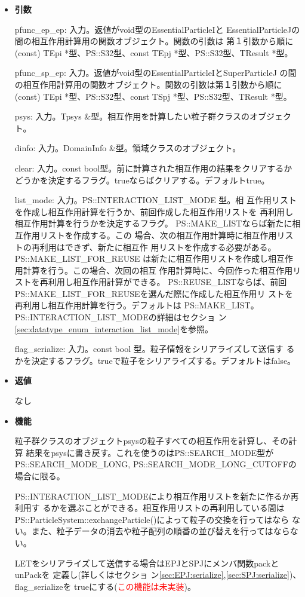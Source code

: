 \begin{itemize}

\item {\bf 引数}

pfunc\_ep\_ep: 入力。返値がvoid型のEssentialParticleIと
EssentialParticleJの間の相互作用計算用の関数オブジェクト。関数の引数は
第１引数から順に(const) TEpi *型、PS::S32型、const
TEpj *型、PS::S32型、TResult *型。

pfunc\_sp\_ep: 入力。返値がvoid型のEssentialParticleIとSuperParticleJ
の間の相互作用計算用の関数オブジェクト。関数の引数は第１引数から順に
(const) TEpi *型、PS::S32型、const TSpj *型、PS::S32型、TResult *型。

psys: 入力。Tpsys \&型。相互作用を計算したい粒子群クラスのオブジェクト。

dinfo: 入力。DomainInfo \&型。領域クラスのオブジェクト。

clear: 入力。const bool型。前に計算された相互作用の結果をクリアするか
どうかを決定するフラグ。trueならばクリアする。デフォルトtrue。

list\_mode: 入力。PS::INTERACTION\_LIST\_MODE 型。相
互作用リストを作成し相互作用計算を行うか、前回作成した相互作用リストを
再利用し相互作用計算を行うかを決定するフラグ。
PS::MAKE\_LISTならば新たに相互作用リストを作成する。この
場合、次の相互作用計算時に相互作用リストの再利用はできず、新たに相互作
用リストを作成する必要がある。PS::MAKE\_LIST\_FOR\_REUSE
は新たに相互作用リストを作成し相互作用計算を行う。この場合、次回の相互
作用計算時に、今回作った相互作用リストを再利用し相互作用計算ができる。
PS::REUSE\_LISTならば、前回
PS::MAKE\_LIST\_FOR\_REUSEを選んだ際に作成した相互作用リ
ストを再利用し相互作用計算を行う。デフォルトは
PS::MAKE\_LIST。PS::INTERACTION\_LIST\_MODEの詳細はセクショ
ン\ref{sec:datatype_enum_interaction_list_mode}を参照。

flag\_serialize: 入力。const bool 型。粒子情報をシリアライズして送信す
るかを決定するフラグ。trueで粒子をシリアライズする。デフォルトはfalse。

\item {\bf 返値}

なし

\item {\bf 機能}

粒子群クラスのオブジェクトpsysの粒子すべての相互作用を計算し、その計算
結果をpsysに書き戻す。これを使うのはPS::SEARCH\_MODE型が
PS::SEARCH\_MODE\_LONG, PS::SEARCH\_MODE\_LONG\_CUTOFFの場合に限る。

PS::INTERACTION\_LIST\_MODEにより相互作用リストを新たに作るか再利用す
るかを選ぶことができる。相互作用リストの再利用している間は
PS::ParticleSystem::exchangeParticle()によって粒子の交換を行ってはなら
ない。また、粒子データの消去や粒子配列の順番の並び替えを行ってはならな
い。

LETをシリアライズして送信する場合はEPJとSPJにメンバ関数packとunPackを
定義し(詳しくはセクショ
ン\ref{sec:EPJ:serialize},\ref{sec:SPJ:serialize})、flag\_serializeを
trueにする(\textcolor{red}{この機能は未実装})。

\end{itemize}

